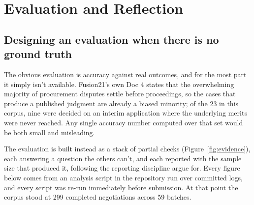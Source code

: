 \chapter{Evaluation and Reflection}
\label{ch:evaluation}

\section{Designing an evaluation when there is no ground truth}
\label{sec:eval-design}

The obvious evaluation is accuracy against real outcomes, and for the most part it
simply isn't available. Fusion21's own Doc 4 states that the overwhelming
majority of procurement disputes settle before proceedings, so the cases that
produce a published judgment are already a biased minority; of the 23 in this
corpus, nine were decided on an interim application where the underlying merits
were never reached. Any single accuracy number computed over that set
would be both small and misleading.

The evaluation is built instead as a stack of partial checks
(Figure~\ref{fig:evidence}), each answering a question the others can't, and each
reported with the sample size that produced it, following the reporting
discipline \citet{dodge2019showyourwork} argue for. Every figure below comes from an
analysis script in the repository run over committed logs, and every script was
re-run immediately before submission. At that point the corpus stood at 299
completed negotiations across 59 batches.

